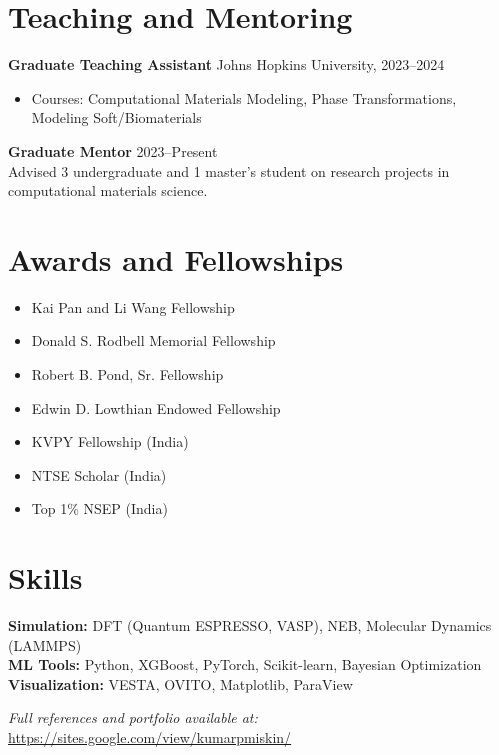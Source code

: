 \documentclass[10pt]{article}
\begin{document}
\section*{Teaching and Mentoring}
\textbf{Graduate Teaching Assistant} \hfill Johns Hopkins University, 2023--2024 \\
\begin{itemize}[leftmargin=*]
    \item Courses: Computational Materials Modeling, Phase Transformations, Modeling Soft/Biomaterials
\end{itemize}
\textbf{Graduate Mentor} \hfill 2023--Present \\
Advised 3 undergraduate and 1 master's student on research projects in computational materials science.

\section*{Awards and Fellowships}
\begin{multicols}{2}
\begin{itemize}[leftmargin=*]
    \item Kai Pan and Li Wang Fellowship
    \item Donald S. Rodbell Memorial Fellowship
    \item Robert B. Pond, Sr. Fellowship
    \item Edwin D. Lowthian Endowed Fellowship
    \item KVPY Fellowship (India)
    \item NTSE Scholar (India)
    \item Top 1\% NSEP (India)
\end{itemize}
\end{multicols}

\section*{Skills}
\textbf{Simulation:} DFT (Quantum ESPRESSO, VASP), NEB, Molecular Dynamics (LAMMPS) \\
\textbf{ML Tools:} Python, XGBoost, PyTorch, Scikit-learn, Bayesian Optimization \\
\textbf{Visualization:} VESTA, OVITO, Matplotlib, ParaView

\vspace{1em}
\noindent\textit{Full references and portfolio available at:} \href{https://sites.google.com/view/kumarpmiskin/}{https://sites.google.com/view/kumarpmiskin/}
\end{document}

